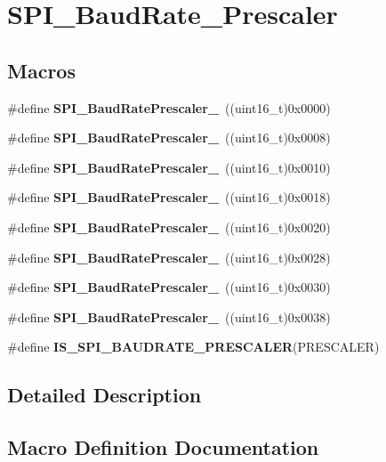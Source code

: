 \section{S\+P\+I\+\_\+\+Baud\+Rate\+\_\+\+Prescaler}
\label{group__SPI__BaudRate__Prescaler}
\subsection*{Macros}
\begin{DoxyCompactItemize}
\item 
\#define \textbf{ S\+P\+I\+\_\+\+Baud\+Rate\+Prescaler\+\_}~((uint16\+\_\+t)0x0000)
\item 
\#define \textbf{ S\+P\+I\+\_\+\+Baud\+Rate\+Prescaler\+\_}~((uint16\+\_\+t)0x0008)
\item 
\#define \textbf{ S\+P\+I\+\_\+\+Baud\+Rate\+Prescaler\+\_}~((uint16\+\_\+t)0x0010)
\item 
\#define \textbf{ S\+P\+I\+\_\+\+Baud\+Rate\+Prescaler\+\_}~((uint16\+\_\+t)0x0018)
\item 
\#define \textbf{ S\+P\+I\+\_\+\+Baud\+Rate\+Prescaler\+\_}~((uint16\+\_\+t)0x0020)
\item 
\#define \textbf{ S\+P\+I\+\_\+\+Baud\+Rate\+Prescaler\+\_}~((uint16\+\_\+t)0x0028)
\item 
\#define \textbf{ S\+P\+I\+\_\+\+Baud\+Rate\+Prescaler\+\_}~((uint16\+\_\+t)0x0030)
\item 
\#define \textbf{ S\+P\+I\+\_\+\+Baud\+Rate\+Prescaler\+\_}~((uint16\+\_\+t)0x0038)
\item 
\#define \textbf{ I\+S\+\_\+\+S\+P\+I\+\_\+\+B\+A\+U\+D\+R\+A\+T\+E\+\_\+\+P\+R\+E\+S\+C\+A\+L\+ER}(P\+R\+E\+S\+C\+A\+L\+ER)
\end{DoxyCompactItemize}


\subsection{Detailed Description}


\subsection{Macro Definition Documentation}
\mbox{\label{group__SPI__BaudRate__Prescaler_gae79f46ed9f91e39dc1f6912cb25fc716}} 
